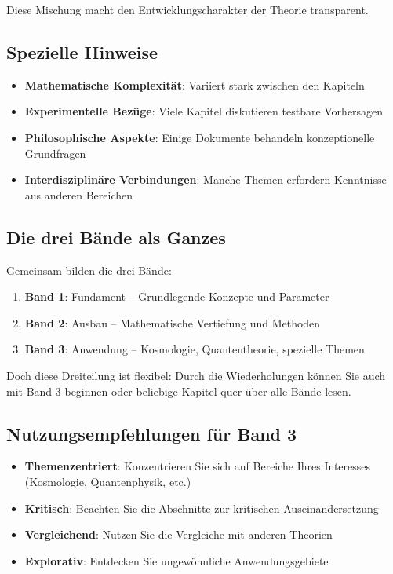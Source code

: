 Diese Mischung macht den Entwicklungscharakter der Theorie transparent.

\subsection*{Spezielle Hinweise}

\begin{itemize}
\item \textbf{Mathematische Komplexität}: Variiert stark zwischen den Kapiteln
\item \textbf{Experimentelle Bezüge}: Viele Kapitel diskutieren testbare Vorhersagen
\item \textbf{Philosophische Aspekte}: Einige Dokumente behandeln konzeptionelle Grundfragen
\item \textbf{Interdisziplinäre Verbindungen}: Manche Themen erfordern Kenntnisse aus anderen Bereichen
\end{itemize}

\subsection*{Die drei Bände als Ganzes}

Gemeinsam bilden die drei Bände:

\begin{enumerate}
\item \textbf{Band 1}: Fundament -- Grundlegende Konzepte und Parameter
\item \textbf{Band 2}: Ausbau -- Mathematische Vertiefung und Methoden
\item \textbf{Band 3}: Anwendung -- Kosmologie, Quantentheorie, spezielle Themen
\end{enumerate}

Doch diese Dreiteilung ist flexibel: Durch die Wiederholungen können Sie auch mit Band 3 beginnen oder beliebige Kapitel quer über alle Bände lesen.

\subsection*{Nutzungsempfehlungen für Band 3}

\begin{itemize}
\item \textbf{Themenzentriert}: Konzentrieren Sie sich auf Bereiche Ihres Interesses (Kosmologie, Quantenphysik, etc.)
\item \textbf{Kritisch}: Beachten Sie die Abschnitte zur kritischen Auseinandersetzung
\item \textbf{Vergleichend}: Nutzen Sie die Vergleiche mit anderen Theorien
\item \textbf{Explorativ}: Entdecken Sie ungewöhnliche Anwendungsgebiete
\end{itemize}

